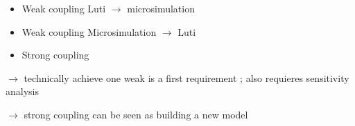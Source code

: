 \documentclass[english,11pt,usenames,dvipsnames]{beamer}
\begin{document}
{%


\begin{itemize}
	\item Weak coupling Luti $\rightarrow$ microsimulation
	\item Weak coupling Microsimulation $\rightarrow$ Luti
	\item Strong coupling
\end{itemize}


\medskip

$\rightarrow$ technically achieve one weak is a first requirement ; also requieres sensitivity analysis

$\rightarrow$ strong coupling can be seen as building a new model


}
\end{document}
